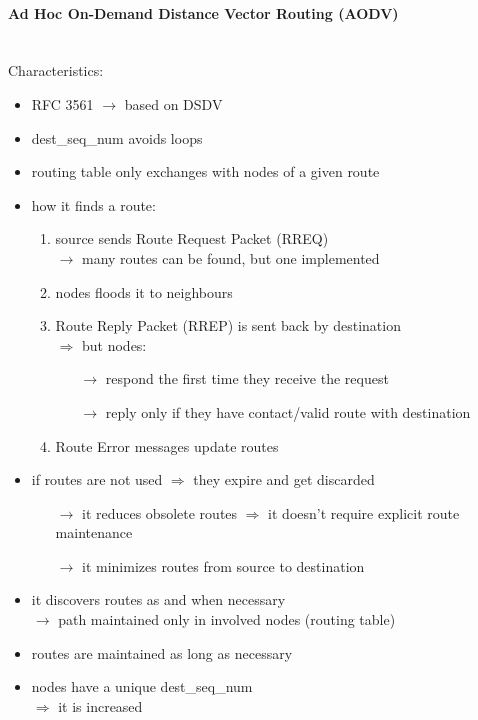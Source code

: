 \paragraph{Ad Hoc On-Demand Distance Vector Routing (AODV)}\mbox{}\\[0.2cm]
Characteristics:
\begin{itemize}
    \item RFC 3561 $\rightarrow$ based on DSDV
    \item dest\_seq\_num avoids loops
    \item routing table only exchanges with nodes of a given route
    \item how it finds a route:
    \begin{enumerate}
        \item source sends Route Request Packet (RREQ)\\$\rightarrow$ many routes can be found, but one implemented
        \item nodes floods it to neighbours
        \item Route Reply Packet (RREP) is sent back by destination\\
        $\Rightarrow$ but nodes:
        \begin{itemize}
            \item[$\rightarrow$] respond the first time they receive the request
            \item[$\rightarrow$] reply only if they have contact/valid route with destination
        \end{itemize}
        \item Route Error messages update routes
    \end{enumerate}
    \item if routes are not used $\Rightarrow$ they expire and get discarded
    \begin{itemize}
        \item[$\rightarrow$] it reduces obsolete routes $\Rightarrow$ it doesn't require explicit route maintenance
        \item[$\rightarrow$] it minimizes routes from source to destination
    \end{itemize}
        \item it discovers routes as and when necessary\\$\rightarrow$ path maintained only in involved nodes (routing table)
        \item routes are maintained as long as necessary
        \item nodes have a unique dest\_seq\_num\\$\Rightarrow$ it is increased

\end{itemize}
